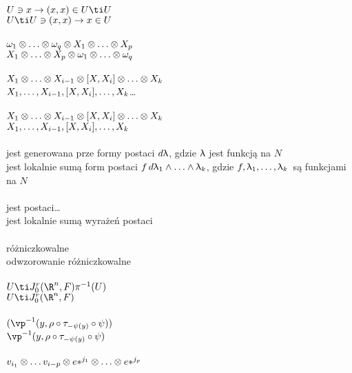 \documentclass[a4paper,11pt]{article}
\begin{document}
 \\
\Jest $U \ni x \to ( x, x ) \in U \ti U$ \\
\Pow $U \ti U \ni ( x, x ) \to x \in U$ \\
 \\
\Jest $\omega_{ 1 } \otimes \ldots \otimes \omega_{ q } \otimes X_{ 1 } \otimes \ldots
\otimes X_{ p }$ \\
\Pow $X_{ 1 } \otimes \ldots \otimes X_{ p } \otimes \omega_{ 1 } \otimes \ldots \otimes
\omega_{ q }$ \\
 \\
\Jest $X_{ 1 } \otimes \ldots \otimes X_{ i - 1 } \otimes [ X, X_{ i } ] \otimes \ldots
\otimes X_{ k }$\ld \\
\Pow $X_{ 1 }, \ldots, X_{ i - 1 }, [ X, X_{ i } ], \ldots, X_{ k }$\ldots \\
 \\
\Jest $X_{ 1 } \otimes \ldots \otimes X_{ i - 1 } \otimes [ X, X_{ i } ] \otimes \ldots
\otimes X_{ k }$\ld \\
\Pow $X_{ 1 }, \ldots, X_{ i - 1 }, [ X, X_{ i } ], \ldots, X_{ k }$\ld \\
 \\
\Jest jest generowana prze formy postaci $d \uplambda$, gdzie $\uplambda$
jest funkcją na $N$\ld \\
\Pow jest lokalnie sumą form postaci
$f\, d\uplambda_{ 1 } \wedge \ldots \wedge \uplambda_{ k }$, gdzie
$f, \uplambda_{ 1 }, \ldots, \uplambda_{ k }$~są funkcjami na $N$\ld \\
 \\
\Jest jest postaci\ldots \\
\Pow  jest lokalnie sumą wyrażeń postaci\ld \\
 \\
\Jest różniczkowalne \\
\Pow  odwzorowanie różniczkowalne \\
 \\
\Jest $U \ti J^{ r }_{ 0 }( \R^{ n }, F ) \pi^{ -1 }( U )$ \\
\Pow  $U \ti J^{ r }_{ 0 }( \R^{ n }, F )$ \\
 \\
\Jest $( \vp^{ -1 }( y, \rho \circ \tau_{ -\psi( y ) } \circ \psi ) )$ \\
\Pow  $\vp^{ -1 }( y, \rho \circ \tau_{ -\psi( y ) } \circ \psi )$ \\
 \\
\Jest $v_{ i_{ 1 } } \otimes \ldots v_{ i - p } \otimes { e* }^{ j_{ 1 } } \otimes
\ldots \otimes { e* }^{ j_{ p } }$ \\
\end{document}

